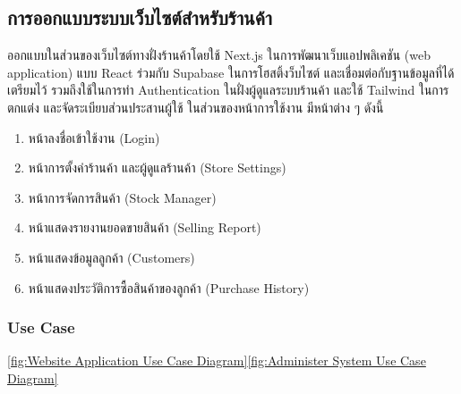 \subsection{การออกแบบระบบเว็บไซต์สำหรับร้านค้า}
ออกแบบในส่วนของเว็บไซต์ทางฝั่งร้านค้าโดยใช้ Next.js ในการพัฒนาเว็บแอปพลิเคชัน (web application) แบบ React ร่วมกับ Supabase ในการโฮสติ้งว็บไซต์ และเชื่อมต่อกับฐานข้อมูลที่ได้เตรียมไว้ รวมถึงใช้ในการทำ Authentication ในฝั่งผู้ดูแลระบบร้านค้า และใช้ Tailwind ในการตกแต่ง และจัดระเบียบส่วนประสานผู้ใช้ ในส่วนของหน้าการใช้งาน มีหน้าต่าง ๆ ดังนี้
\begin{enumerate}
  \item หน้าลงชื่อเข้าใช้งาน (Login)
  \item หน้าการตั้งค่าร้านค้า และผู้ดูแลร้านค้า (Store Settings)
  \item หน้าการจัดการสินค้า (Stock Manager)
  \item หน้าแสดงรายงานยอดขายสินค้า (Selling Report)
  \item หน้าแสดงข้อมูลลูกค้า (Customers)
  \item หน้าแสดงประวัติการซื้อสินค้าของลูกค้า (Purchase History)
\end{enumerate}
\subsubsection{Use Case}
\ref{fig:Website Application Use Case Diagram}\ref{fig:Administer System Use Case Diagram}

